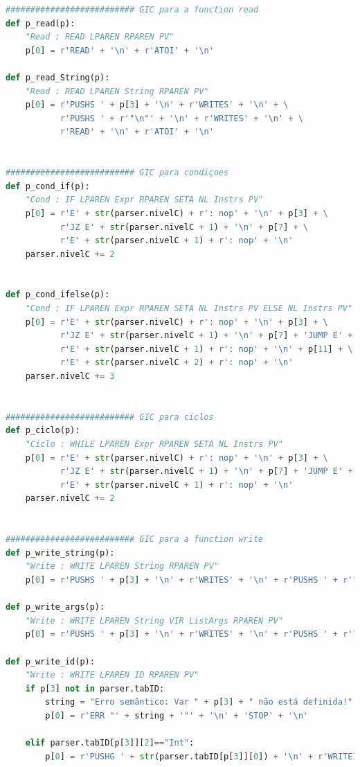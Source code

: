 \documentclass{article}
\begin{document}
\begin{lstlisting}[language=Python]
########################## GIC para a function read
def p_read(p):
    "Read : READ LPAREN RPAREN PV"
    p[0] = r'READ' + '\n' + r'ATOI' + '\n'

def p_read_String(p):
    "Read : READ LPAREN String RPAREN PV"
    p[0] = r'PUSHS ' + p[3] + '\n' + r'WRITES' + '\n' + \
           r'PUSHS ' + r'"\n"' + '\n' + r'WRITES' + '\n' + \
           r'READ' + '\n' + r'ATOI' + '\n'


########################## GIC para condiçoes
def p_cond_if(p):
    "Cond : IF LPAREN Expr RPAREN SETA NL Instrs PV"
    p[0] = r'E' + str(parser.nivelC) + r': nop' + '\n' + p[3] + \
           r'JZ E' + str(parser.nivelC + 1) + '\n' + p[7] + \
           r'E' + str(parser.nivelC + 1) + r': nop' + '\n'
    parser.nivelC += 2


def p_cond_ifelse(p):
    "Cond : IF LPAREN Expr RPAREN SETA NL Instrs PV ELSE NL Instrs PV"
    p[0] = r'E' + str(parser.nivelC) + r': nop' + '\n' + p[3] + \
           r'JZ E' + str(parser.nivelC + 1) + '\n' + p[7] + 'JUMP E' + str(parser.nivelC + 2) + '\n' + \
           r'E' + str(parser.nivelC + 1) + r': nop' + '\n' + p[11] + \
           r'E' + str(parser.nivelC + 2) + r': nop' + '\n'
    parser.nivelC += 3


########################## GIC para ciclos
def p_ciclo(p):
    "Ciclo : WHILE LPAREN Expr RPAREN SETA NL Instrs PV"
    p[0] = r'E' + str(parser.nivelC) + r': nop' + '\n' + p[3] + \
           r'JZ E' + str(parser.nivelC + 1) + '\n' + p[7] + 'JUMP E' + str(parser.nivelC) + '\n' + \
           r'E' + str(parser.nivelC + 1) + r': nop' + '\n'
    parser.nivelC += 2


########################## GIC para a function write
def p_write_string(p):
    "Write : WRITE LPAREN String RPAREN PV"   
    p[0] = r'PUSHS ' + p[3] + '\n' + r'WRITES' + '\n' + r'PUSHS ' + r'"\n"' + '\n' + r'WRITES' + '\n'

def p_write_args(p):
    "Write : WRITE LPAREN String VIR ListArgs RPAREN PV"
    p[0] = r'PUSHS ' + p[3] + '\n' + r'WRITES' + '\n' + r'PUSHS ' + r'"\n"' + '\n' + r'WRITES' + '\n' + p[5]

def p_write_id(p):
    "Write : WRITE LPAREN ID RPAREN PV"
    if p[3] not in parser.tabID:
        string = "Erro semântico: Var " + p[3] + " não está definida!" + '\n'
        p[0] = r'ERR "' + string + '"' + '\n' + 'STOP' + '\n'

    elif parser.tabID[p[3]][2]=="Int":
        p[0] = r'PUSHG ' + str(parser.tabID[p[3]][0]) + '\n' + r'WRITEI' + '\n' + r'PUSHS ' + r'"\n"' + '\n' + r'WRITES' + '\n'


\end{lstlisting}
\end{document}
